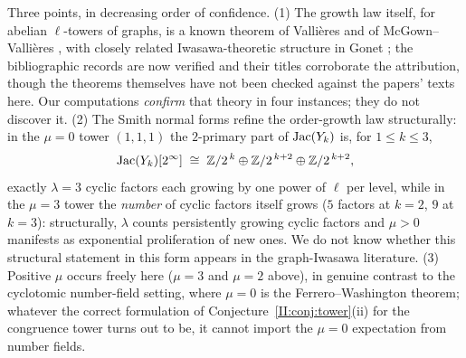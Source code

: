 \begin{remark}\label{II:rem:towerhonest}
Three points, in decreasing order of confidence. (1) The growth law itself, for abelian
$\ell$-towers of graphs, is a known theorem of Vallières and of McGown--Vallières
\cite{Vallieres,McGownVallieres}, with closely related Iwasawa-theoretic structure in
Gonet \cite{Gonet}; the bibliographic records are now verified and their titles
corroborate the attribution, though the theorems themselves have not been checked
against the papers' texts here. Our computations \emph{confirm} that theory in four
instances; they do not discover it. (2) The Smith normal forms refine the order-growth
law structurally: in the $\mu=0$ tower $(1,1,1)$ the $2$-primary part of $\operatorname{Jac}(Y_k)$ is,
for $1\le k\le3$,
\[
\operatorname{Jac}(Y_k)[2^\infty]\;\cong\;\mathbb{Z}/2^{\,k}\oplus\mathbb{Z}/2^{\,k+2}\oplus\mathbb{Z}/2^{\,k+2},
\]
exactly $\lambda=3$ cyclic factors each growing by one power of $\ell$ per level, while
in the $\mu=3$ tower the \emph{number} of cyclic factors itself grows ($5$ factors at
$k=2$, $9$ at $k=3$): structurally, $\lambda$ counts persistently growing cyclic factors
and $\mu>0$ manifests as exponential proliferation of new ones. We do not know whether
this structural statement in this form appears in the graph-Iwasawa literature.
(3) Positive $\mu$ occurs freely here ($\mu=3$ and $\mu=2$ above), in genuine contrast to
the cyclotomic number-field setting, where $\mu=0$ is the Ferrero--Washington theorem;
whatever the correct formulation of Conjecture~\ref{II:conj:tower}(ii) for the congruence
tower turns out to be, it cannot import the $\mu=0$ expectation from number fields.
\end{remark}

